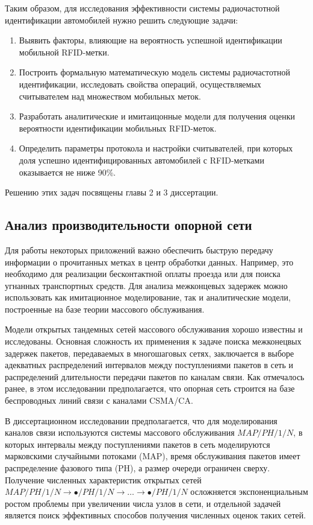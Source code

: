Таким образом, для исследования эффективности системы радиочастотной идентификации автомобилей нужно решить следующие задачи:

\begin{enumerate}
    \item Выявить факторы, влияющие на вероятность успешной идентификации мобильной RFID-метки.
    \item Построить формальную математическую модель системы радиочастотной идентификации, исследовать свойства операций, осуществляемых считывателем над множеством мобильных меток.
    \item Разработать аналитические и имитаицонные модели для получения оценки вероятности идентификации мобильных RFID-меток.
    \item Определить параметры протокола и настройки считывателей, при которых доля успешно идентифицированных автомобилей с RFID-метками оказывается не ниже 90\%.
\end{enumerate}

Решению этих задач посвящены главы 2 и 3 диссертации.



\subsection{Анализ производительности опорной сети}

Для работы некоторых приложений важно обеспечить быструю передачу информации о прочитанных метках в центр обработки данных. Например, это необходимо для реализации бесконтактной оплаты проезда или для поиска угнанных транспортных средств. Для анализа межконцевых задержек можно использовать как имитационное моделирование, так и аналитические модели, построенные на базе теории массового обслуживания.

Модели открытых тандемных сетей массового обслуживания хорошо известны и исследованы. Основная сложность их применения к задаче поиска межконецвых задержек пакетов, передаваемых в многошаговых сетях, заключается в выборе адекватных распределений интервалов между поступлениями пакетов в сеть и распределений длительности передачи пакетов по каналам связи. Как отмечалось ранее, в этом исследовании предполагается, что опорная сеть строится на базе беспроводных линий связи с каналами CSMA/CA.

В диссертационном исследовании предполагается, что для моделирования каналов связи используются системы массового обслуживания $MAP/PH/1/N$, в которых интервалы между поступлениями пакетов в сеть моделируются марковскими случайными потоками (MAP), время обслуживания пакетов имеет распределение фазового типа (PH), а размер очереди ограничен сверху. Получение численных характеристик открытых сетей $MAP/PH/1/N \rightarrow \bullet/PH/1/N \rightarrow \dots \rightarrow \bullet/PH/1/N$ осложняется экспоненциальным ростом проблемы при увеличении числа узлов в сети, и отдельной задачей является поиск эффективных способов получения численных оценок таких сетей.

